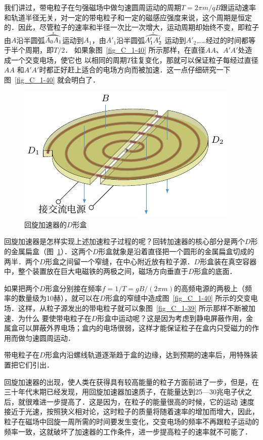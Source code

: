 我们讲过，带电粒子在匀强磁场中做匀速圆周运动的周期$T=2\pi m/qB$跟运动速率和轨道半径无关，对一定的带电粒子和一定的磁感应强度来说，这个周期是恒定的．因此，尽管粒子的速率和半径一次比一次增大，运动周期却始终不变，即粒子由$A$沿半圆弧$\widering{A_0A_1}$运动到$A_1$，由$A'_1$沿半圆弧$\widering{A'_1A'_2}$
运动到$A'_2$……经过的时间都等于半个周期，即$T/2$．
如果象图~\ref{fig_C_1-40} 所示那样，在直径$AA$、$A'A'$处造成一个交变电场，使它也
以相同的周期$T$往复变化，那就可以保证粒子每经过直径$AA$
和$A'A'$时都正好赶上适合的电场方向而被加速．这一点仔细研究一下图~\ref{fig_C_1-40} 就会明白了．

\begin{figure}[htbp]
    \centering
    \includegraphics{fig/C/1-41.pdf}
    \caption{回旋加速器的$D$形盒}\label{fig_C_1-41}
\end{figure}

回旋加速器是怎样实现上述加速粒子过程的呢？回转加速器的核心部分是两个$D$形的金属扁盒（图~\ref{fig_C_1-41}）．这两个$D$形盒就象是沿着直径把一个圆形的金属扁盒切成的两半．两个$D$形盒之间留一个窄缝，在中心附近放有粒子源．$D$形盒装在真空容器中，整个装置放在巨大电磁铁的两极之间，磁场方向垂直于$D$形盒的底面．

如果把两个$D$形盒分别接在频率$f=1/T=gB/(2\pi m)$的高频电源的两极上（频率的数量级为10赫），就可以在$D$形盒的窄缝中造成图~\ref{fig_C_1-40} 所示的交变电场．这样，从粒子源发出的带电粒子就可以象图~\ref{fig_C_1-39} 所示那样不断被加速．为什么
要使带电粒子在$D$形盒中运动呢？这是因为考虑到静电屏蔽作用，金属盒可以屏蔽外界电场；盒内的电场很弱，这样才能保证粒子在盒内只受磁力的作用而做匀速圆周运动．

带电粒子在$D$形盒内沿螺线轨道逐渐趋于盒的边缘，达到预期的速率后，用特殊装置把它们引出．

回旋加速器的出现，使人类在获得具有较高能量的粒子方面前进了一步，但是，在三十年代末期已经发现，用回旋加速器加速质子，在能量达到25—30兆电子伏之后，就很难进一步提高了．这是因为，在粒子的能量很高的时候，它的运动
速度接近于光速，按照狭义相对论，这时粒子的质量将随着速率的增加而增大，因此，粒子在磁场中回旋一周所需的时间要发生变化，交变电场的频率不再跟粒子运动的频率一致，这就破坏了加速器的工作条件，进一步提高粒子的速率就不可能了．


